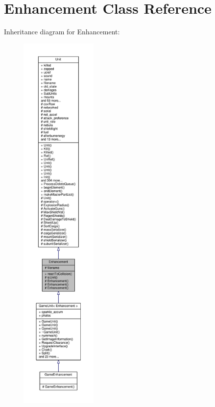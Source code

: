 \hypertarget{classEnhancement}{}\section{Enhancement Class Reference}
\label{classEnhancement}


Inheritance diagram for Enhancement\+:
\nopagebreak
\begin{figure}[H]
\begin{center}
\leavevmode
\includegraphics[height=550pt]{d2/dab/classEnhancement__inherit__graph}
\end{center}
\end{figure}



